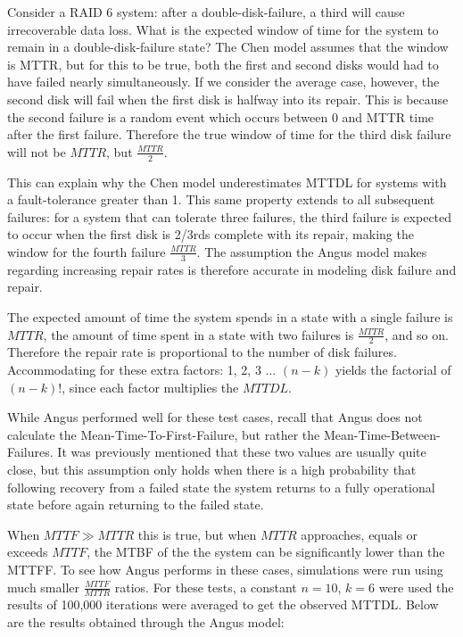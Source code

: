 \documentclass[XXX,endnotes]{usetex-v1}
\begin{document}
Consider a RAID 6 system: after a double-disk-failure, a third will cause irrecoverable data loss.  What is the expected window of time for the system to remain in a double-disk-failure state?  The Chen model assumes that the window is MTTR, but for this to be true, both the first and second disks would had to have failed nearly simultaneously.  If we consider the average case, however, the second disk will fail when the first disk is halfway into its repair.  This is because the second failure is a random event which occurs between 0 and MTTR time after the first failure.  Therefore the true window of time for the third disk failure will not be $MTTR$, but $\frac{MTTR}{2}$.

This can explain why the Chen model underestimates MTTDL for systems with a fault-tolerance greater than 1.  This same property extends to all subsequent failures: for a system that can tolerate three failures, the third failure is expected to occur when the first disk is 2/3rds complete with its repair, making the window for the fourth failure $\frac{MTTR}{3}$.  The assumption the Angus model makes regarding increasing repair rates is therefore accurate in modeling disk failure and repair.

The expected amount of time the system spends in a state with a single failure is $MTTR$, the amount of time spent in a state with two failures is $\frac{MTTR}{2}$, and so on.  Therefore the repair rate is proportional to the number of disk failures.  Accommodating for these extra factors: 1, 2, 3 ... $(n-k)$ yields the factorial of $(n-k)!$, since each factor multiplies the $MTTDL$.

While Angus performed well for these test cases, recall that Angus does not calculate the Mean-Time-To-First-Failure, but rather the Mean-Time-Between-Failures.  It was previously mentioned that these two values are usually quite close, but this assumption only holds when there is a high probability that following recovery from a failed state the system returns to a fully operational state before again returning to the failed state.

When $MTTF \gg MTTR$ this is true, but when $MTTR$ approaches, equals or exceeds $MTTF$, the MTBF of the the system can be significantly lower than the MTTFF.  To see how Angus performs in these cases, simulations were run using much smaller $\frac{MTTF}{MTTR}$ ratios.  For these tests, a constant $n = 10$, $k = 6$ were used the results of 100,000 iterations were averaged to get the observed MTTDL.  Below are the results obtained through the Angus model:
\end{document}
